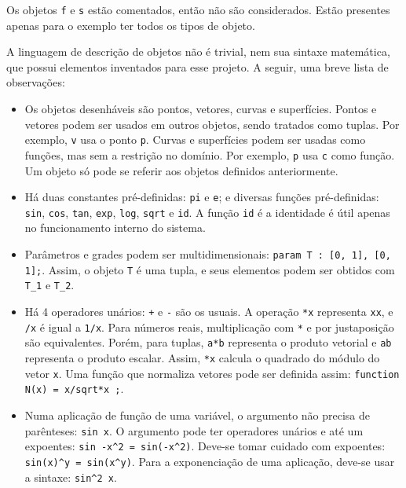 Os objetos \texttt{f} e \texttt{s} estão comentados, então não são considerados.
Estão presentes apenas para o exemplo ter todos os tipos de objeto.

A linguagem de descrição de objetos não é trivial, nem sua sintaxe matemática,
que possui elementos inventados para esse projeto.
A seguir, uma breve lista de observações:

\begin{itemize}
\item
Os objetos desenháveis são pontos, vetores, curvas e superfícies.
Pontos e vetores podem ser usados em outros objetos, sendo tratados como tuplas.
Por exemplo, \texttt{v} usa o ponto \texttt{p}.
Curvas e superfícies podem ser usadas como funções, mas sem a restrição no domínio.
Por exemplo, \texttt{p} usa \texttt{c} como função.
Um objeto só pode se referir aos objetos definidos anteriormente.

\item
Há duas constantes pré-definidas: \texttt{pi} e \texttt{e}; e diversas funções pré-definidas:
\texttt{sin}, \texttt{cos}, \texttt{tan},
\texttt{exp}, \texttt{log}, \texttt{sqrt} e \texttt{id}.
A função \texttt{id} é a identidade é útil apenas no funcionamento interno do sistema.

\item
Parâmetros e grades podem ser multidimensionais:
\texttt{param T : [0, 1], [0, 1];}. Assim, o objeto \texttt{T} é uma tupla,
e seus elementos podem ser obtidos com \texttt{T\_1} e \texttt{T\_2}.

\item
Há 4 operadores unários: \texttt{+} e \texttt{-} são os usuais.
A operação \texttt{*x} representa \texttt{xx}, e \texttt{/x} é igual a \texttt{1/x}.
Para números reais, multiplicação com \texttt{*} e por justaposição são equivalentes.
Porém, para tuplas, \texttt{a*b} representa o produto vetorial
e \texttt{ab} representa o produto escalar.
Assim, \texttt{*x} calcula o quadrado do módulo do vetor \texttt{x}.
Uma função que normaliza vetores pode ser definida assim: \texttt{function N(x) = x/sqrt*x ;}.

\item
Numa aplicação de função de uma variável, o argumento não precisa de parênteses:
\texttt{sin x}.
O argumento pode ter operadores unários e até um expoentes:
\texttt{sin -x\textasciicircum2 = sin(-x\textasciicircum2)}.
Deve-se tomar cuidado com expoentes: \texttt{sin(x)\textasciicircum y = sin(x\textasciicircum y)}.
Para a exponenciação de uma aplicação, deve-se usar a sintaxe: \texttt{sin\textasciicircum2 x}.
\end{itemize}

